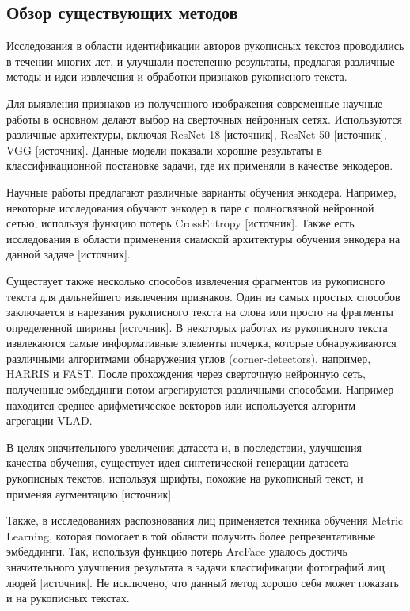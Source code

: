 \subsection{Обзор существующих методов}
    Исследования в области идентификации авторов рукописных текстов проводились в течении многих лет, и улучшали постепенно результаты, предлагая различные методы и идеи извлечения и обработки признаков рукописного текста. 
    
    Для выявления признаков из полученного изображения современные научные работы в основном делают выбор на сверточных нейронных сетях. Используются различные архитектуры, включая ResNet-18 [источник], ResNet-50 [источник], VGG [источник]. Данные модели показали хорошие результаты в классификационной постановке задачи, где их применяли в качестве энкодеров.

    Научные работы предлагают различные варианты обучения энкодера. Например, некоторые исследования обучают энкодер в паре с полносвязной нейронной сетью, используя функцию потерь CrossEntropy [источник]. Также есть исследования в области применения сиамской архитектуры обучения энкодера на данной задаче [источник].  

    Существует также несколько способов извлечения фрагментов из рукописного текста для дальнейшего извлечения признаков. Один из самых простых способов заключается в нарезания рукописного текста на слова или просто на фрагменты определенной ширины [источник]. В некоторых работах из рукописного текста извлекаются самые информативные элементы почерка, которые обнаруживаются различными алгоритмами обнаружения углов (corner-detectors), например, HARRIS и FAST. После прохождения через сверточную нейронную сеть, полученные эмбеддинги потом агрегируются различными способами. Например находится среднее арифметическое векторов или используется алгоритм агрегации VLAD. 

    В целях значительного увеличения датасета и, в последствии, улучшения качества обучения, существует идея синтетической генерации датасета рукописных текстов, используя шрифты, похожие на рукописный текст, и применяя аугментацию [источник]. 

    Также, в исследованиях распознования лиц применяется техника обучения Metric Learning, которая помогает в той области получить более репрезентативные эмбеддинги. Так, используя функцию потерь ArcFace удалось достичь значительного улучшения результата в задачи классификации фотографий лиц людей [источник]. Не исключено, что данный метод хорошо себя может показать и на рукописных текстах.
    
